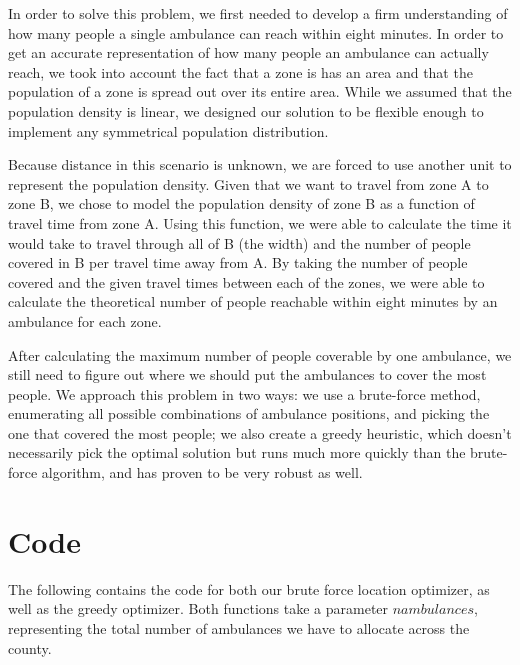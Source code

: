 \documentclass[notitlepage, 12pt]{article}
\begin{document}
In order to solve this problem, we first needed to develop a firm understanding of how many people a single ambulance can reach within eight minutes. In order to get an accurate representation of how many people an ambulance can actually reach, we took into account the fact that a zone is has an area and that the population of a zone is spread out over its entire area. While we assumed that the population density is linear, we designed our solution to be flexible enough to implement  any  symmetrical population distribution.

Because distance in this scenario is unknown, we are forced to use another unit to represent the population density. Given that we want to travel from zone A to zone B, we chose to model the population density of zone B as a function of travel time from zone A. Using this function, we were able to calculate the time it would take to travel through all of B (the width) and the number of people covered in B per travel time away from A. By taking the number of people covered and the given travel times between each of the zones, we were able to calculate the theoretical number of people reachable within eight minutes by an ambulance for each zone.

After calculating the maximum number of people coverable by one ambulance, we still need to figure out where we should put the ambulances to cover the most people. We approach this problem in two ways: we use a brute-force method, enumerating all possible combinations of ambulance positions, and picking the one that covered the most people; we also create a greedy heuristic, which doesn’t necessarily pick the optimal solution but runs much more quickly than the brute-force algorithm, and has proven to be very robust as well.

\newpage
\appendix
\section{Code}
The following contains the code for both our brute force location optimizer, as well as the greedy optimizer. Both functions take a parameter $nambulances$, representing the total number of ambulances we have to allocate across the county.




\end{document}
